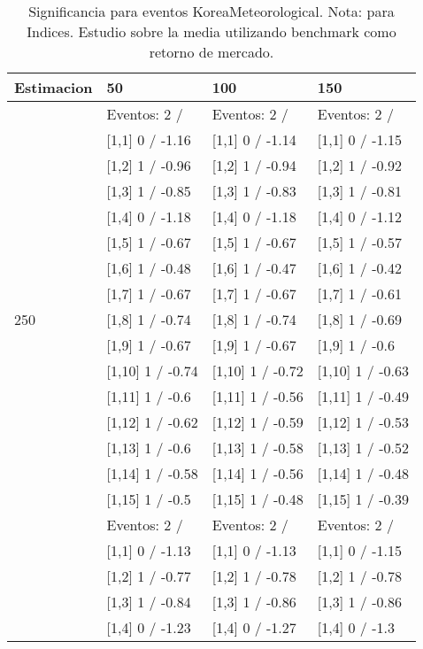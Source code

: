 \begin{table}

\caption{Significancia para eventos KoreaMeteorological. Nota: para Indices. Estudio sobre la media utilizando benchmark como retorno de mercado.}
\centering
\begin{tabular}[t]{llll}
\toprule
Estimacion & 50 & 100 & 150\\
\midrule
 & Eventos:  2 / & Eventos:  2 / & Eventos:  2 /\\
 & {}[1,1] 0  / -1.16 & {}[1,1] 0  / -1.14 & {}[1,1] 0  / -1.15\\
 & {}[1,2] 1  / -0.96 & {}[1,2] 1  / -0.94 & {}[1,2] 1  / -0.92\\
 & {}[1,3] 1  / -0.85 & {}[1,3] 1  / -0.83 & {}[1,3] 1  / -0.81\\
 & {}[1,4] 0  / -1.18 & {}[1,4] 0  / -1.18 & {}[1,4] 0  / -1.12\\
\addlinespace
 & {}[1,5] 1  / -0.67 & {}[1,5] 1  / -0.67 & {}[1,5] 1  / -0.57\\
 & {}[1,6] 1  / -0.48 & {}[1,6] 1  / -0.47 & {}[1,6] 1  / -0.42\\
 & {}[1,7] 1  / -0.67 & {}[1,7] 1  / -0.67 & {}[1,7] 1  / -0.61\\
250 & {}[1,8] 1  / -0.74 & {}[1,8] 1  / -0.74 & {}[1,8] 1  / -0.69\\
 & {}[1,9] 1  / -0.67 & {}[1,9] 1  / -0.67 & {}[1,9] 1  / -0.6\\
\addlinespace
 & {}[1,10] 1  / -0.74 & {}[1,10] 1  / -0.72 & {}[1,10] 1  / -0.63\\
 & {}[1,11] 1  / -0.6 & {}[1,11] 1  / -0.56 & {}[1,11] 1  / -0.49\\
 & {}[1,12] 1  / -0.62 & {}[1,12] 1  / -0.59 & {}[1,12] 1  / -0.53\\
 & {}[1,13] 1  / -0.6 & {}[1,13] 1  / -0.58 & {}[1,13] 1  / -0.52\\
 & {}[1,14] 1  / -0.58 & {}[1,14] 1  / -0.56 & {}[1,14] 1  / -0.48\\
\addlinespace
 & {}[1,15] 1  / -0.5 & {}[1,15] 1  / -0.48 & {}[1,15] 1  / -0.39\\
 & Eventos:  2 / & Eventos:  2 / & Eventos:  2 /\\
 & {}[1,1] 0  / -1.13 & {}[1,1] 0  / -1.13 & {}[1,1] 0  / -1.15\\
 & {}[1,2] 1  / -0.77 & {}[1,2] 1  / -0.78 & {}[1,2] 1  / -0.78\\
 & {}[1,3] 1  / -0.84 & {}[1,3] 1  / -0.86 & {}[1,3] 1  / -0.86\\
\addlinespace
 & {}[1,4] 0  / -1.23 & {}[1,4] 0  / -1.27 & {}[1,4] 0  / -1.3\\

\end{tabular}
\end{table}
